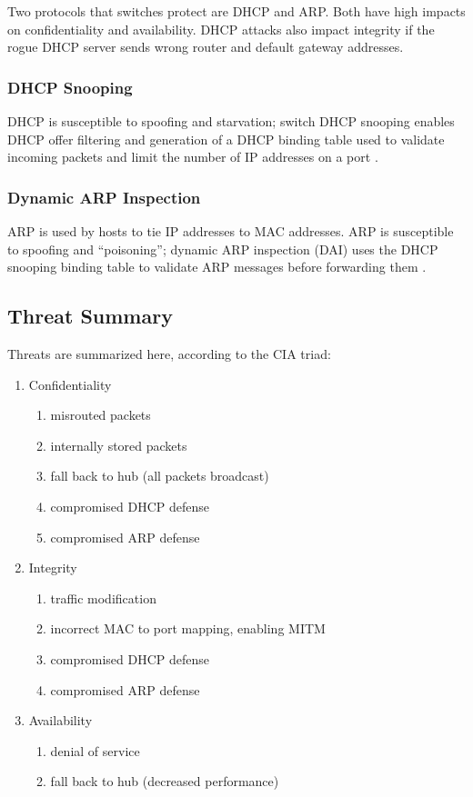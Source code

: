 \documentclass[journal]{IEEEtran}
\begin{document}
Two protocols that switches protect are DHCP and ARP. Both have high impacts on confidentiality and
availability. DHCP attacks also impact integrity if the rogue DHCP server sends wrong router and
default gateway addresses.

\subsubsection{DHCP Snooping} DHCP is susceptible to spoofing and starvation; switch DHCP snooping
enables DHCP offer filtering and generation of a DHCP binding table used to validate incoming
packets and limit the number of IP addresses on a port \cite{b2}.

\subsubsection{Dynamic ARP Inspection} ARP is used by hosts to tie IP addresses to MAC addresses.
ARP is susceptible to spoofing and ``poisoning''; dynamic ARP inspection (DAI) uses the DHCP
snooping binding table to validate ARP messages before forwarding them \cite{b2}.

\subsection{Threat Summary}
Threats are summarized here, according to the CIA triad:
\begin{enumerate}
  \item Confidentiality
  \begin{enumerate}
    \item misrouted packets
    \item internally stored packets
    \item fall back to hub (all packets broadcast)
    \item compromised DHCP defense
    \item compromised ARP defense
  \end{enumerate}
  \item Integrity
  \begin{enumerate}
    \item traffic modification
    \item incorrect MAC to port mapping, enabling MITM
    \item compromised DHCP defense
    \item compromised ARP defense
  \end{enumerate}
  \item Availability
  \begin{enumerate}
    \item denial of service
    \item fall back to hub (decreased performance)
  \end{enumerate}
\end{enumerate}
\end{document}
